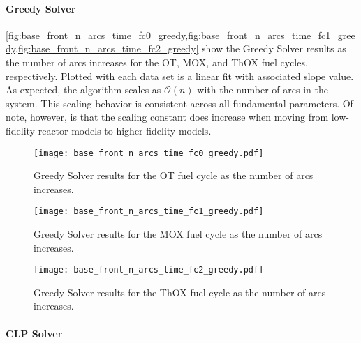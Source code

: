 \paragraph{Greedy Solver}

\cref{fig:base_front_n_arcs_time_fc0_greedy,fig:base_front_n_arcs_time_fc1_greedy,fig:base_front_n_arcs_time_fc2_greedy}
show the Greedy Solver results as the number of arcs increases for the OT, MOX,
and ThOX fuel cycles, respectively. Plotted with each data set is a linear fit
with associated slope value. As expected, the algorithm scales as
$\mathcal{O}(n)$ with the number of arcs in the system. This scaling behavior is
consistent across all fundamental parameters. Of note, however, is that the
scaling constant does increase when moving from low-fidelity reactor models to
higher-fidelity models.

\begin{figure}[h!]
  \begin{center}
    \texttt{[image: base\_front\_n\_arcs\_time\_fc0\_greedy.pdf]}
    \caption{
      \label{fig:base_front_n_arcs_time_fc0_greedy}
      Greedy Solver results for the OT fuel cycle as the number of arcs
      increases.  }
  \end{center}
\end{figure}

\begin{figure}[h!]
  \begin{center}
    \texttt{[image: base\_front\_n\_arcs\_time\_fc1\_greedy.pdf]}
    \caption{
      \label{fig:base_front_n_arcs_time_fc1_greedy}
      Greedy Solver results for the MOX fuel cycle as the number of arcs
      increases.
    }
  \end{center}
\end{figure}

\begin{figure}[h!]
  \begin{center}
    \texttt{[image: base\_front\_n\_arcs\_time\_fc2\_greedy.pdf]}
    \caption{
      \label{fig:base_front_n_arcs_time_fc2_greedy}
      Greedy Solver results for the ThOX fuel cycle as the number of arcs
      increases.
      }
  \end{center}
\end{figure}

\paragraph{CLP Solver}

